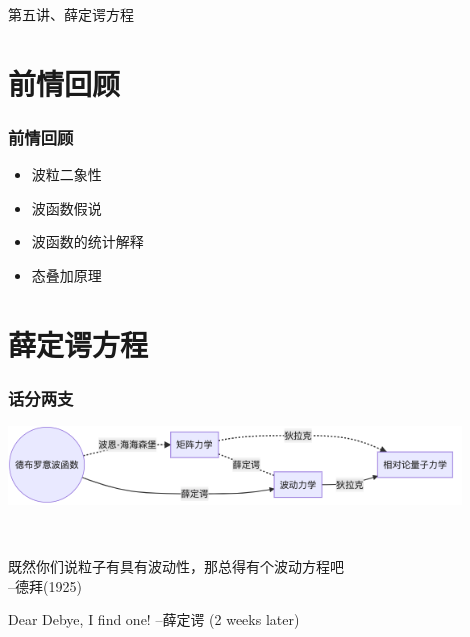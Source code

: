 
\begin{frame}
    \frametitle{}
    \begin{center}
    { {\huge 第五讲、薛定谔方程}}
    \end{center}    
\end{frame}


\section{前情回顾}

\begin{frame}
    \frametitle{前情回顾}
    \begin{itemize}
        \item 波粒二象性
        \item 波函数假说
        \item 波函数的统计解释
        \item 态叠加原理
    \end{itemize}
\end{frame}  

\section{薛定谔方程}

\begin{frame}
    \frametitle{话分两支}
    \begin{center}
        \includegraphics[width=0.9\textwidth]{figs/2021-12-06-16-22-39.png}\\   
    \end{center}
    ~~\\
    \begin{tcolorbox}[colback=yellow!10,colframe=red!75!black,title=]
    既然你们说粒子有具有波动性，那总得有个波动方程吧\\
    \qquad \qquad \qquad \qquad \qquad --德拜(1925)
    \end{tcolorbox}
\end{frame}

\begin{frame}
    \begin{tcolorbox}[colback=yellow!10,colframe=red!75!black,title=]
        Dear Debye, I find one!\hspace{3cm} --薛定谔 (2 weeks later)
    \end{tcolorbox}
\end{frame}

